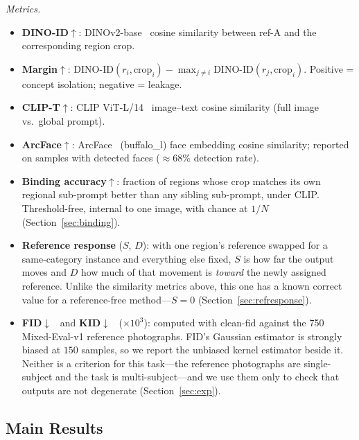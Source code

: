 \documentclass[review,10pt,times]{elsarticle}
\begin{document}
\noindent\textit{Metrics.}
\begin{itemize}\setlength\itemsep{2pt}
\item \textbf{DINO-ID}$\uparrow$: DINOv2-base~\cite{oquab2024dinov2}
      cosine similarity between ref-A and the corresponding region crop.
\item \textbf{Margin}$\uparrow$:
      $\mathrm{DINO\text{-}ID}(r_i,\mathrm{crop}_i)
       -\max_{j\neq i}\mathrm{DINO\text{-}ID}(r_j,\mathrm{crop}_i)$.
      Positive = concept isolation; negative = leakage.
\item \textbf{CLIP-T}$\uparrow$: CLIP ViT-L/14~\cite{radford2021learning}
      image–text cosine similarity (full image vs.\ global prompt).
\item \textbf{ArcFace}$\uparrow$: ArcFace~\cite{deng2019arcface}
      (buffalo\_l) face embedding
      cosine similarity; reported on samples with detected faces
      (${\approx}68\%$ detection rate).
\item \textbf{Binding accuracy}$\uparrow$: fraction of regions whose crop
      matches its own regional sub-prompt better than any sibling
      sub-prompt, under CLIP.  Threshold-free, internal to one image, with
      chance at $1/N$ (Section~\ref{sec:binding}).
\item \textbf{Reference response} ($S$, $D$): with one region's reference
      swapped for a same-category instance and everything else fixed, $S$ is
      how far the output moves and $D$ how much of that movement is
      \emph{toward} the newly assigned reference.  Unlike the similarity
      metrics above, this one has a known correct value for a
      reference-free method---$S{=}0$ (Section~\ref{sec:refresponse}).
\item \textbf{FID}$\downarrow$~\cite{heusel2017gans} and
      \textbf{KID}$\downarrow$~\cite{binkowski2018demystifying}
      ($\times 10^{3}$): computed with clean-fid against the 750
      Mixed-Eval-v1 reference photographs.  FID's Gaussian estimator is
      strongly biased at $150$ samples, so we report the unbiased kernel
      estimator beside it.  Neither is a criterion for this task---the
      reference photographs are single-subject and the task is
      multi-subject---and we use them only to check that outputs are not
      degenerate (Section~\ref{sec:exp}).
\end{itemize}

\subsection{Main Results}
\label{sec:main_results}
\end{document}
